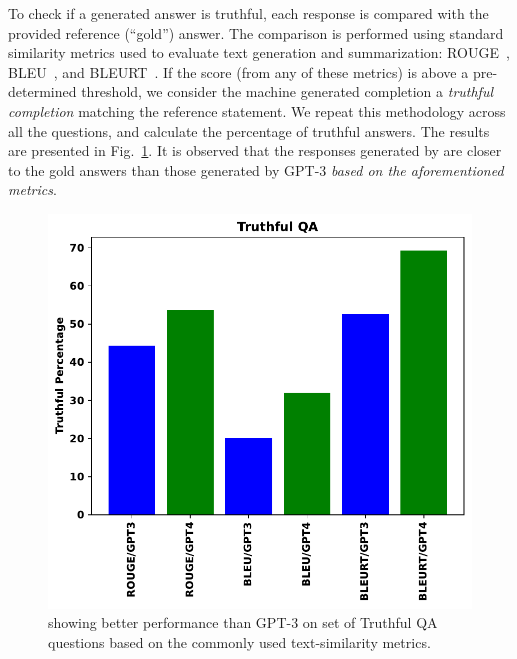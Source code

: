 To check if a generated answer is truthful, each response is compared with the provided reference (``gold'') answer. The comparison is performed using standard similarity metrics used to evaluate text generation and summarization: ROUGE~\cite{lin2004rouge}, BLEU~\cite{papineni2002bleu}, and BLEURT~\cite{sellam2020bleurt}. If the score (from any of these metrics) is above a pre-determined threshold, we consider the machine generated completion a \textit{truthful completion} matching the reference statement. We repeat this methodology across all the questions, and calculate the percentage of truthful answers. The results are presented in Fig.~\ref{fig:misconceptions_metrics}.%
It is observed that the responses generated by {\DV} are closer to the gold answers than those generated by GPT-3 \textit{based on the aforementioned metrics}. 




\begin{figure}[h!]
\centering
\label{fig:misconception_metrics1}
\includegraphics[width=0.49\linewidth]{fig_hp/Truthful_QA_Accuracy.pdf}
\caption{{\DV} showing better performance than GPT-3 on set of Truthful QA questions based on the commonly used text-similarity metrics.}
\label{fig:misconceptions_metrics}
\end{figure}


